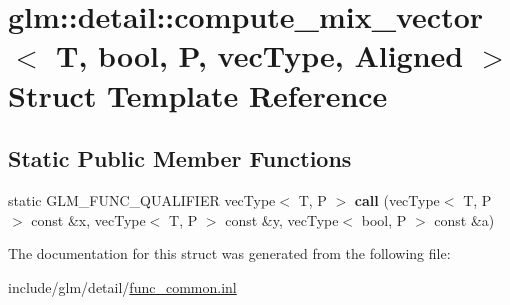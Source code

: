 \hypertarget{structglm_1_1detail_1_1compute__mix__vector_3_01T_00_01bool_00_01P_00_01vecType_00_01Aligned_01_4}{}\section{glm\+:\+:detail\+:\+:compute\+\_\+mix\+\_\+vector$<$ T, bool, P, vec\+Type, Aligned $>$ Struct Template Reference}
\label{structglm_1_1detail_1_1compute__mix__vector_3_01T_00_01bool_00_01P_00_01vecType_00_01Aligned_01_4}
\subsection*{Static Public Member Functions}
\begin{DoxyCompactItemize}
\item 
\mbox{\label{structglm_1_1detail_1_1compute__mix__vector_3_01T_00_01bool_00_01P_00_01vecType_00_01Aligned_01_4_a0db7a91dcc65f5bcca16a354a8ba7c48}} 
static G\+L\+M\+\_\+\+F\+U\+N\+C\+\_\+\+Q\+U\+A\+L\+I\+F\+I\+ER vec\+Type$<$ T, P $>$ {\bfseries call} (vec\+Type$<$ T, P $>$ const \&x, vec\+Type$<$ T, P $>$ const \&y, vec\+Type$<$ bool, P $>$ const \&a)
\end{DoxyCompactItemize}


The documentation for this struct was generated from the following file\+:\begin{DoxyCompactItemize}
\item 
include/glm/detail/\hyperlink{func__common_8inl}{func\+\_\+common.\+inl}\end{DoxyCompactItemize}
